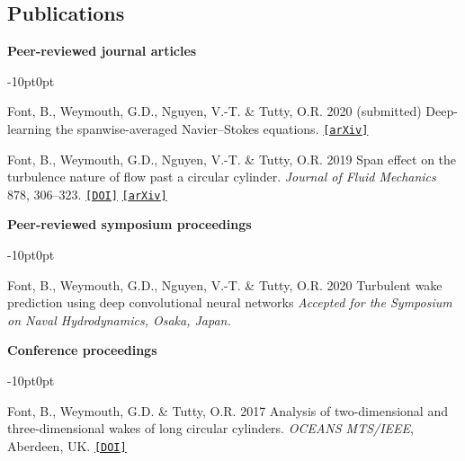 \documentclass[line]{res}
\newenvironment{p}
  {\begin{adjustwidth}{-10pt}{0pt}}
  {\end{adjustwidth}}
\begin{document}
\begin{resume}
\section{Publications}
\vspace{0.25cm}
\hspace{-1cm}\textbf{Peer-reviewed journal articles}\vspace{0.25cm}
\begin{p}
\begin{etaremune}[leftmargin=-2pt,parsep=5pt]
\item Font, B., Weymouth, G.D., Nguyen, V.-T. \& Tutty, O.R. 2020 (submitted) Deep-learning the spanwise-averaged Navier--Stokes equations. \href{https://arxiv.org/abs/2008.07528}{\texttt{[arXiv]}}
\item Font, B., Weymouth, G.D., Nguyen, V.-T. \& Tutty, O.R. 2019 Span effect on the turbulence nature of flow past a circular cylinder. \textit{Journal of Fluid Mechanics} 878, 306--323. \href{https://doi.org/10.1017/jfm.2019.637}{\texttt{[DOI]}} \href{https://arxiv.org/abs/2008.08933}{\texttt{[arXiv]}}
\end{etaremune}
\end{p}

\hspace{-1cm}\textbf{Peer-reviewed symposium proceedings}\vspace{0.25cm}
\begin{p}
\begin{etaremune}[leftmargin=-2pt,parsep=5pt]
\item Font, B., Weymouth, G.D., Nguyen, V.-T. \& Tutty, O.R. 2020 Turbulent wake prediction using deep convolutional neural networks \textit{Accepted for the Symposium on Naval Hydrodynamics, Osaka, Japan.}
\end{etaremune}
\end{p}

\hspace{-1cm}\textbf{Conference proceedings}\vspace{0.25cm}
\begin{p}
\begin{etaremune}[leftmargin=-2pt,parsep=5pt]
\item Font, B., Weymouth, G.D.  \&  Tutty, O.R. 2017 Analysis of two-dimensional and three-dimensional wakes of long circular cylinders. {\em OCEANS MTS/IEEE}, Aberdeen, UK. \href{https://doi.org/10.1109/OCEANSE.2017.8084904}{\texttt{[DOI]}}
\end{etaremune}
\end{p}


\end{resume}
\end{document}
